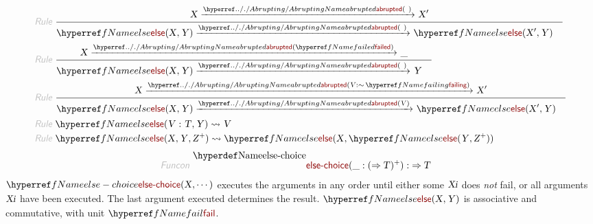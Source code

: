 \begin{align*}
  \KEY{Rule} ~ 
    & \RULE{
       \VAR{X} \xrightarrow{\NAMEHYPER{../.}{Abrupting}{abrupted}(  ~  )}_{} 
        \VAR{X}'
      }{
      &  \NAMEREF{else}
                      ( \VAR{X},   
                        \VAR{Y} ) \xrightarrow{\NAMEHYPER{../.}{Abrupting}{abrupted}(  ~  )}_{} 
          \NAMEREF{else}
            ( \VAR{X}',   
              \VAR{Y} )
      }
\\
  \KEY{Rule} ~ 
    & \RULE{
       \VAR{X} \xrightarrow{\NAMEHYPER{../.}{Abrupting}{abrupted}( \NAMEREF{failed} )}_{} 
        \_
      }{
      &  \NAMEREF{else}
                      ( \VAR{X},   
                        \VAR{Y} ) \xrightarrow{\NAMEHYPER{../.}{Abrupting}{abrupted}(  ~  )}_{} 
          \VAR{Y}
      }
\\
  \KEY{Rule} ~ 
    & \RULE{
       \VAR{X} \xrightarrow{\NAMEHYPER{../.}{Abrupting}{abrupted}( \VAR{V} : \mathop{\sim} \NAMEREF{failing} )}_{} 
        \VAR{X}'
      }{
      &  \NAMEREF{else}
                      ( \VAR{X},   
                        \VAR{Y} ) \xrightarrow{\NAMEHYPER{../.}{Abrupting}{abrupted}( \VAR{V} )}_{} 
          \NAMEREF{else}
            ( \VAR{X}',   
              \VAR{Y} )
      }
\\
  \KEY{Rule} ~ 
    & \NAMEREF{else}
        ( \VAR{V} : \VAR{T},   
          \VAR{Y} ) \leadsto
        \VAR{V}
\\
  \KEY{Rule} ~ 
    & \NAMEREF{else}
        ( \VAR{X},   
          \VAR{Y},   
          \VAR{Z}\PLUS ) \leadsto
        \NAMEREF{else}
          ( \VAR{X},   
            \NAMEREF{else}
              ( \VAR{Y},    
                \VAR{Z}\PLUS ) )
\end{align*}
\begin{align*}
  \KEY{Funcon} ~ 
  & \NAMEDECL{else-choice}(\_ : (  \TO \VAR{T} )\PLUS) :  \TO \VAR{T}
\end{align*}
$\SHADE{\NAMEREF{else-choice}
           ( \VAR{X},   
             \cdots )}$ executes the arguments in any order until either some
  $\SHADE{\VAR{Xi}}$ does \emph{not} fail, or all arguments $\SHADE{\VAR{Xi}}$ have been executed.
  The last argument executed determines the result.
  $\SHADE{\NAMEREF{else}
           ( \VAR{X},   
             \VAR{Y} )}$ is associative and commutative, with unit $\SHADE{\NAMEREF{fail}}$.


